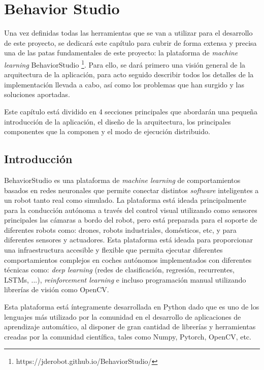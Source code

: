 \chapter{Behavior Studio}

Una vez definidas todas las herramientas que se van a utilizar para el desarrollo de este proyecto, se dedicará este capítulo para cubrir de forma extensa y precisa una de las patas fundamentales de este proyecto: la plataforma de \textit{machine learning} BehaviorStudio \footnote{https://jderobot.github.io/BehaviorStudio/}.
Para ello, se dará primero una visión general de la arquitectura de la aplicación, para acto seguido describir todos los detalles de la implementación llevada a cabo, así como los problemas que han surgido y las soluciones aportadas.

Este capítulo está dividido en 4 secciones principales que abordarán una pequeña introducción de la aplicación, el diseño de la arquitectura, los principales componentes que la componen y el modo de ejecución distribuido.

\section{Introducción}

BehaviorStudio es una plataforma de \textit{machine learning} de comportamientos basados en redes neuronales que permite conectar distintos \textit{software} inteligentes a un robot tanto real como simulado. La plataforma está ideada principalmente para la conducción autónoma a través del control visual utilizando como sensores principales las cámaras a bordo del robot, pero está preparada para el soporte de diferentes robots como: drones, robots industriales, domésticos, etc, y para diferentes sensores y actuadores. Esta plataforma está ideada para proporcionar una infraestructura accesible y flexible que permita ejecutar diferentes comportamientos complejos en coches autónomos implementados con diferentes técnicas como: \textit{deep learning} (redes de clasificación, regresión, recurrentes, LSTMs, ...), \textit{reinforcement learning} e incluso programación manual utilizando librerías de visión como OpenCV.

Esta plataforma está íntegramente desarrollada en Python dado que es uno de los lenguajes más utilizado por la comunidad en el desarrollo de aplicaciones de aprendizaje automático, al disponer de gran cantidad de librerías y herramientas creadas por la comunidad científica, tales como Numpy, Pytorch, OpenCV, etc.

